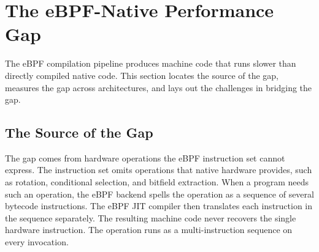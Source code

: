 



\section{The eBPF-Native Performance Gap}
\label{sec:characterization}

The eBPF compilation pipeline produces machine code that runs slower than directly compiled native code. This section locates the source of the gap, measures the gap across architectures, and lays out the challenges in bridging the gap.

\subsection{The Source of the Gap}
\label{subsec:char-source}

The gap comes from hardware operations the eBPF instruction set cannot express. The instruction set omits operations that native hardware provides, such as rotation, conditional selection, and bitfield extraction. When a program needs such an operation, the eBPF backend spells the operation as a sequence of several bytecode instructions. The eBPF JIT compiler then translates each instruction in the sequence separately. The resulting machine code never recovers the single hardware instruction. The operation runs as a multi-instruction sequence on every invocation.

